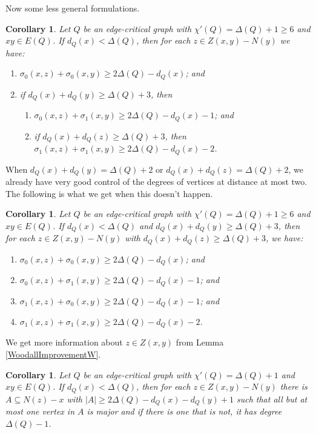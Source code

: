 \documentclass[12pt,reqno]{amsart}
\theoremstyle{plain}
\newtheorem{cor}[thm]{Corollary}
\theoremstyle{definition}
\theoremstyle{remark}
\newcommand{\card}[1]{\left|#1\right|}
\begin{document}
Now some less general formulations.
\begin{cor}\label{WoodallImprovementSimple}
Let $Q$ be an edge-critical graph with $\chi'(Q) = \Delta(Q) + 1 \ge 6$ and $xy \in E(Q)$.  If $d_Q(x) < \Delta(Q)$, then for each $z \in Z(x, y) - N(y)$ we have:
\begin{enumerate}
\item $\sigma_0(x, z) + \sigma_0(x, y) \ge 2\Delta(Q) - d_Q(x)$; and
\item if $d_Q(x) + d_Q(y) \ge \Delta(Q) + 3$, then
	\begin{enumerate}
	\item $\sigma_0(x, z) + \sigma_1(x, y) \ge 2\Delta(Q) - d_Q(x) - 1$; and
    \item if $d_Q(x) + d_Q(z) \ge \Delta(Q) + 3$, then $\sigma_1(x, z) + \sigma_1(x, y) \ge 2\Delta(Q) - d_Q(x) - 2$.
	\end{enumerate}
\end{enumerate}
\end{cor}

When $d_Q(x) + d_Q(y) = \Delta(Q) + 2$ or  $d_Q(x) + d_Q(z) = \Delta(Q) + 2$, we already have very good control of the degrees of vertices at distance at most two.  The following is what we get when this doesn't happen. 

\begin{cor}\label{WoodallImprovementSimpler}
Let $Q$ be an edge-critical graph with $\chi'(Q) = \Delta(Q) + 1 \ge 6$ and $xy \in E(Q)$.  If $d_Q(x) < \Delta(Q)$ and $d_Q(x) + d_Q(y) \ge \Delta(Q) + 3$, then for each $z \in Z(x, y) - N(y)$ 
with $d_Q(x) + d_Q(z) \ge \Delta(Q) + 3$, we have:
\begin{enumerate}
\item $\sigma_0(x, z) + \sigma_0(x, y) \ge 2\Delta(Q) - d_Q(x)$; and
\item $\sigma_0(x, z) + \sigma_1(x, y) \ge 2\Delta(Q) - d_Q(x) - 1$; and
\item $\sigma_1(x, z) + \sigma_0(x, y) \ge 2\Delta(Q) - d_Q(x) - 1$; and
\item $\sigma_1(x, z) + \sigma_1(x, y) \ge 2\Delta(Q) - d_Q(x) - 2$.
\end{enumerate}
\end{cor}

We get more information about $z \in Z(x, y)$ from Lemma \ref{WoodallImprovementW}.

\begin{cor}\label{WoodallImprovementSimpleW}
Let $Q$ be an edge-critical graph with $\chi'(Q) = \Delta(Q) + 1$ and $xy \in E(Q)$.  If $d_Q(x) < \Delta(Q)$, then for each $z \in Z(x, y) - N(y)$ there is $A \subseteq N(z) - x$ with $\card{A} \ge 2\Delta(Q) - d_Q(x) - d_Q(y) + 1$ such that all but at most one vertex in $A$ is major and if there is one that is not, it has degree $\Delta(Q) - 1$.
\end{cor}
\end{document}
